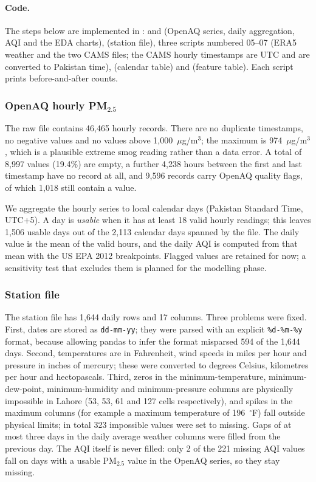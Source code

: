 \paragraph{Code.}
The steps below are implemented in :  and  (OpenAQ series, daily aggregation, AQI and the EDA charts),  (station file), three scripts numbered 05--07 (ERA5 weather and the two CAMS files; the CAMS hourly timestamps are UTC and are converted to Pakistan time),  (calendar table) and  (feature table). Each script prints before-and-after counts.

\subsubsection{OpenAQ hourly PM$_{2.5}$}

The raw file contains 46{,}465 hourly records. There are no duplicate timestamps, no negative values and no values above 1{,}000~$\mu$g/m$^3$; the maximum is 974~$\mu$g/m$^3$, which is a plausible extreme smog reading rather than a data error. A total of 8{,}997 values (19.4\%) are empty, a further 4{,}238 hours between the first and last timestamp have no record at all, and 9{,}596 records carry OpenAQ quality flags, of which 1{,}018 still contain a value.

We aggregate the hourly series to local calendar days (Pakistan Standard Time, UTC+5). A day is \emph{usable} when it has at least 18 valid hourly readings; this leaves 1{,}506 usable days out of the 2{,}113 calendar days spanned by the file. The daily value is the mean of the valid hours, and the daily AQI is computed from that mean with the US EPA 2012 breakpoints. Flagged values are retained for now; a sensitivity test that excludes them is planned for the modelling phase.

\subsubsection{Station file}

The station file has 1{,}644 daily rows and 17 columns. Three problems were fixed. First, dates are stored as \texttt{dd-mm-yy}; they were parsed with an explicit \texttt{\%d-\%m-\%y} format, because allowing pandas to infer the format misparsed 594 of the 1{,}644 days. Second, temperatures are in Fahrenheit, wind speeds in miles per hour and pressure in inches of mercury; these were converted to degrees Celsius, kilometres per hour and hectopascals. Third, zeros in the minimum-temperature, minimum-dew-point, minimum-humidity and minimum-pressure columns are physically impossible in Lahore (53, 53, 61 and 127 cells respectively), and spikes in the maximum columns (for example a maximum temperature of 196~$^\circ$F) fall outside physical limits; in total 323 impossible values were set to missing. Gaps of at most three days in the daily average weather columns were filled from the previous day. The AQI itself is never filled: only 2 of the 221 missing AQI values fall on days with a usable PM$_{2.5}$ value in the OpenAQ series, so they stay missing.

